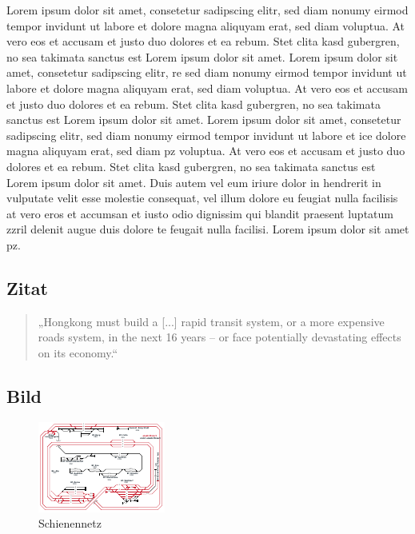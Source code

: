 Lorem ipsum dolor sit amet, consetetur sadipscing elitr, sed diam nonumy eirmod tempor invidunt ut labore et dolore magna aliquyam erat, sed diam voluptua. At vero eos et accusam et justo duo dolores et ea rebum. Stet clita kasd gubergren, no sea takimata  sanctus est Lorem ipsum dolor sit amet. Lorem ipsum dolor sit amet, consetetur sadipscing elitr, \ac{re} sed diam nonumy eirmod tempor invidunt ut labore et dolore magna aliquyam erat, sed diam voluptua. At vero eos et accusam et justo duo dolores et ea rebum. Stet clita kasd gubergren, no sea takimata sanctus est Lorem ipsum dolor sit amet. Lorem ipsum dolor sit amet, consetetur sadipscing elitr, sed diam nonumy eirmod tempor invidunt ut labore et \ac{ice} dolore magna aliquyam erat, sed diam  \ac{pz} voluptua. At vero eos et accusam et justo duo dolores et ea rebum. Stet clita kasd gubergren, no sea takimata sanctus est Lorem ipsum dolor sit amet. Duis autem vel eum iriure dolor in hendrerit in vulputate velit esse molestie consequat, vel illum dolore eu feugiat nulla facilisis at vero eros et accumsan et iusto odio dignissim qui blandit praesent luptatum zzril delenit augue duis dolore te feugait nulla facilisi. Lorem ipsum dolor sit amet \ac{pz}.

\subsection{Zitat}

\begin{quote}
\label{intro}„Hongkong must build a [...] rapid transit system, or a more expensive roads system, in the next 16 years – or face potentially devastating effects on its economy.“
\end{quote}

\subsection{Bild}

\begin{figure}[h]
  \includegraphics[width=\linewidth]{../images/plan.pdf}
  \caption{Schienennetz}
\end{figure}

